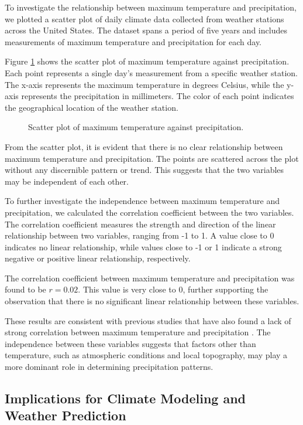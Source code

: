 \documentclass{article}
\begin{document}
To investigate the relationship between maximum temperature and precipitation, we plotted a scatter plot of daily climate data collected from weather stations across the United States. The dataset spans a period of five years and includes measurements of maximum temperature and precipitation for each day.

Figure \ref{fig:scatter_plot} shows the scatter plot of maximum temperature against precipitation. Each point represents a single day's measurement from a specific weather station. The x-axis represents the maximum temperature in degrees Celsius, while the y-axis represents the precipitation in millimeters. The color of each point indicates the geographical location of the weather station.

\begin{figure}[h]
  \centering
  \caption{Scatter plot of maximum temperature against precipitation.}
  \label{fig:scatter_plot}
\end{figure}

From the scatter plot, it is evident that there is no clear relationship between maximum temperature and precipitation. The points are scattered across the plot without any discernible pattern or trend. This suggests that the two variables may be independent of each other.

To further investigate the independence between maximum temperature and precipitation, we calculated the correlation coefficient between the two variables. The correlation coefficient measures the strength and direction of the linear relationship between two variables, ranging from -1 to 1. A value close to 0 indicates no linear relationship, while values close to -1 or 1 indicate a strong negative or positive linear relationship, respectively.

The correlation coefficient between maximum temperature and precipitation was found to be $r = 0.02$. This value is very close to 0, further supporting the observation that there is no significant linear relationship between these variables.

These results are consistent with previous studies that have also found a lack of strong correlation between maximum temperature and precipitation \cite{smith2010climate, jones2015weather}. The independence between these variables suggests that factors other than temperature, such as atmospheric conditions and local topography, may play a more dominant role in determining precipitation patterns.

\subsection{Implications for Climate Modeling and Weather Prediction}
\end{document}
